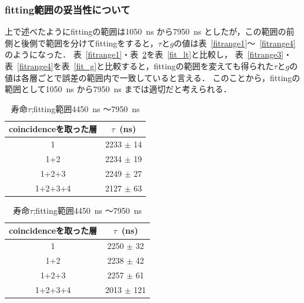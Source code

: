     \subsubsection{fitting範囲の妥当性について}
  上で述べたようにfittingの範囲は1050~ns から7950~ns としたが，この範囲の前側と後側で範囲を分けてfittingをすると，$\tau$と$g$の値は表~\ref{fitrange1}〜~\ref{fitrange4}のようになった．
  表~\ref{fitrange1}・表~\ref{fitrange2}を表~\ref{fit_lt}と比較し，
  表~\ref{fitrange3}・表~\ref{fitrange4}を表~\ref{fit_g}と比較すると，fittingの範囲を変えても得られた$\tau$と$g$の値は各層ごとで誤差の範囲内で一致していると言える．
  このことから，fittingの範囲として1050~ns から7950~ns までは適切だと考えられる．
  \begin{table}[H]
   \centering
   \begin{minipage}{0.4\columnwidth}
   \caption{寿命$\tau$;fitting範囲1050~ns 〜4550~ns }
   \label{fitrange1}
   \begin{center}
    \begin{tabular}{cc}\toprule
     coincidenceを取った層 & $\tau$~(ns) \\ \midrule
     1 			   & 2233 $\pm$ 14 \\
     1+2 		   & 2234 $\pm$ 19 \\
     1+2+3 		   & 2249 $\pm$ 27 \\
     1+2+3+4 	           & 2127 $\pm$ 63 \\ \bottomrule
    \end{tabular}
   \end{center}
   \end{minipage}
   \hspace*{5mm}
   \begin{minipage}{0.4\columnwidth}
    \caption{寿命$\tau$;fitting範囲4450~ns 〜7950~ns }
    \label{fitrange2}
    \begin{center}
     \begin{tabular}{cc}\toprule
      coincidenceを取った層 & $\tau$~(ns) \\ \midrule
      1 			   & 2250 $\pm$ 32 \\
      1+2 		   & 2238 $\pm$ 42 \\
      1+2+3 		   & 2257 $\pm$ 61 \\
      1+2+3+4 		   & 2013 $\pm$ 121 \\ \bottomrule
     \end{tabular}
    \end{center}   
   \end{minipage}
  \end{table}%


